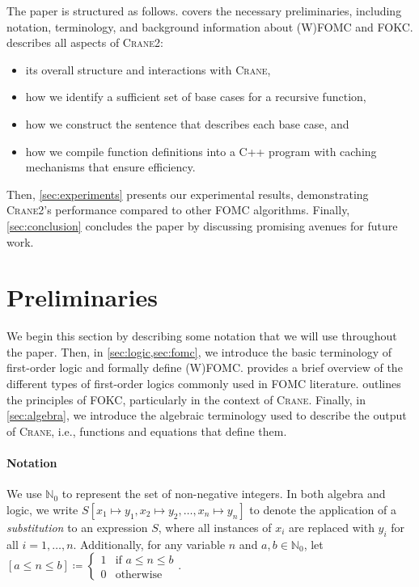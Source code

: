 \documentclass[a4paper,UKenglish,cleveref,autoref,table]{lipics-v2021}
\newcommand{\Cranetwo}{\textsc{Crane2}}
\begin{document}
The paper is structured as follows.  covers the
necessary preliminaries, including notation, terminology, and background
information about (W)FOMC and FOKC\@.  describes all aspects of
\Cranetwo{}:
\begin{itemize}
  \item its overall structure and interactions with \textsc{Crane},
  \item how we identify a sufficient set of base cases for a recursive function,
  \item how we construct the sentence that describes each base case, and
  \item how we compile function definitions into a C++ program with caching
        mechanisms that ensure efficiency.
\end{itemize}
Then, \cref{sec:experiments} presents our experimental results, demonstrating
\Cranetwo{}'s performance compared to other FOMC algorithms. Finally,
\cref{sec:conclusion} concludes the paper by discussing promising avenues for
future work.

\section{Preliminaries}\label{sec:preliminaries}

We begin this section by describing some notation that we will use throughout
the paper. Then, in \cref{sec:logic,sec:fomc}, we introduce the basic
terminology of first-order logic and formally define (W)FOMC\@.
 provides a brief overview of the different types of
first-order logics commonly used in FOMC literature.  outlines
the principles of FOKC, particularly in the context of \textsc{Crane}. Finally,
in \cref{sec:algebra}, we introduce the algebraic terminology used to describe
the output of \textsc{Crane}, i.e., functions and equations that define them.

\paragraph*{Notation}
We use $\mathbb{N}_{0}$ to represent the set of non-negative integers. In both
algebra and logic, we write
$S[x_{1} \mapsto y_{1}, x_{2} \mapsto y_{2}, \dots, x_{n} \mapsto y_{n}]$ to
denote the application of a \emph{substitution} to an expression $S$, where all
instances of $x_{i}$ are replaced with $y_{i}$ for all $i = 1, \dots, n$.
Additionally, for any variable $n$ and $a, b \in \mathbb{N}_{0}$, let
$[a \le n \le b] \coloneqq \begin{cases}
  1 & \text{if $a \le n \le b$} \\
  0 & \text{otherwise}
\end{cases}$.
\end{document}
